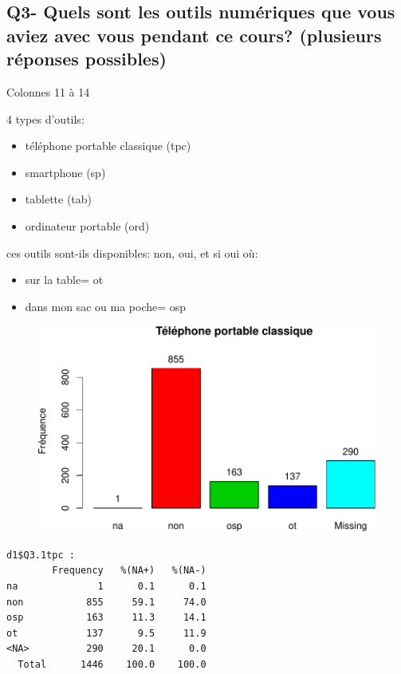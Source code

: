 \documentclass[]{article}
\begin{document}
\subsection{Q3- Quels sont les outils numériques que vous aviez avec
vous pendant ce cours? (plusieurs réponses
possibles)}\label{q3--quels-sont-les-outils-numeriques-que-vous-aviez-avec-vous-pendant-ce-cours-plusieurs-reponses-possibles}

Colonnes 11 à 14

4 types d'outils:

\begin{itemize}
\itemsep1pt\parskip0pt
\item
  téléphone portable classique (tpc)
\item
  smartphone (sp)
\item
  tablette (tab)
\item
  ordinateur portable (ord)
\end{itemize}

ces outils sont-ils disponibles: non, oui, et si oui où:

\begin{itemize}
\itemsep1pt\parskip0pt
\item
  sur la table= ot
\item
  dans mon sac ou ma poche= osp
\end{itemize}

\begin{figure}[htbp]
\centering
\includegraphics{qs_etudiants_files/figure-latex/outils-1.pdf}
\end{figure}

\begin{verbatim}
d1$Q3.1tpc : 
        Frequency   %(NA+)   %(NA-)
na              1      0.1      0.1
non           855     59.1     74.0
osp           163     11.3     14.1
ot            137      9.5     11.9
<NA>          290     20.1      0.0
  Total      1446    100.0    100.0
\end{verbatim}
\end{document}
